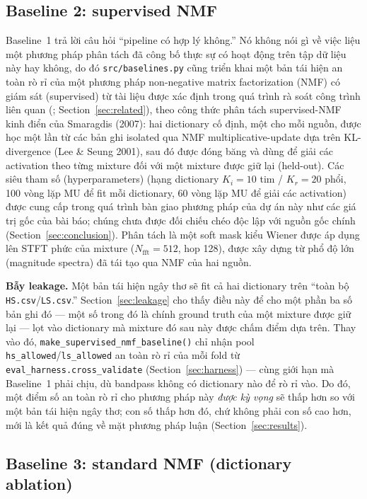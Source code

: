 \documentclass[11pt]{article}
\begin{document}
\subsection{Baseline 2: supervised NMF}
\label{sec:baseline2}

Baseline~1 trả lời câu hỏi ``pipeline có hợp lý không.'' Nó không nói gì
về việc liệu một phương pháp phân tách đã công bố thực sự có hoạt động
trên tập dữ liệu này hay không, do đó \texttt{src/baselines.py} cũng
triển khai một bản tái hiện an toàn rò rỉ của một phương pháp
non-negative matrix factorization (NMF) có giám sát (supervised) từ tài
liệu được xác định trong quá trình rà soát công trình liên quan
(\cite{nmfcrnn}; Section~\ref{sec:related}), theo công thức phân tách
supervised-NMF kinh điển của Smaragdis (2007): hai dictionary cố định,
một cho mỗi nguồn, được học một lần từ các bản ghi isolated qua NMF
multiplicative-update dựa trên KL-divergence (Lee \& Seung 2001), sau đó
được đóng băng và dùng để giải các activation theo từng mixture đối với
một mixture được giữ lại (held-out). Các siêu tham số (hyperparameters)
(hạng dictionary $K_i{=}10$ tim / $K_r{=}20$ phổi, 100 vòng lặp MU để fit
mỗi dictionary, 60 vòng lặp MU để giải các activation) được cung cấp
trong quá trình bàn giao phương pháp của dự án này như các giá trị gốc
của bài báo; chúng chưa được đối chiếu chéo độc lập với nguồn gốc chính
(Section~\ref{sec:conclusion}). Phân tách là một soft mask kiểu Wiener
được áp dụng lên STFT phức của mixture ($N_{\text{fft}}{=}512$, hop 128),
được xây dựng từ phổ độ lớn (magnitude spectra) đã tái tạo qua NMF của
hai nguồn.

\textbf{Bẫy leakage.} Một bản tái hiện ngây thơ sẽ fit cả hai dictionary
trên ``toàn bộ \texttt{HS.csv}/\texttt{LS.csv}.'' Section~\ref{sec:leakage}
cho thấy điều này để cho một phần ba số bản ghi đó --- một số trong đó là
chính ground truth của một mixture được giữ lại --- lọt vào dictionary
mà mixture đó sau này được chấm điểm dựa trên. Thay vào đó,
\texttt{make\_supervised\_nmf\_baseline()} chỉ nhận pool
\texttt{hs\_allowed}/\texttt{ls\_allowed} an toàn rò rỉ của mỗi fold từ
\texttt{eval\_harness.cross\_validate} (Section~\ref{sec:harness}) ---
cùng giới hạn mà Baseline~1 phải chịu, dù bandpass không có dictionary
nào để rò rỉ vào. Do đó, một điểm số an toàn rò rỉ cho phương pháp này
\emph{được kỳ vọng} sẽ thấp hơn so với một bản tái hiện ngây thơ; con số
thấp hơn đó, chứ không phải con số cao hơn, mới là kết quả đúng về mặt
phương pháp luận (Section~\ref{sec:results}).

\subsection{Baseline 3: standard NMF (dictionary ablation)}
\label{sec:baseline3}
\end{document}

